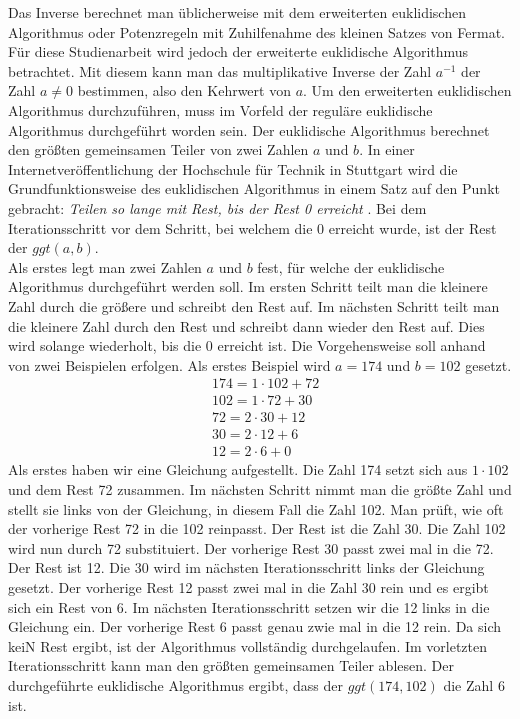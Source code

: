 Das Inverse berechnet man üblicherweise mit dem erweiterten euklidischen Algorithmus oder Potenzregeln mit Zuhilfenahme des kleinen Satzes von Fermat. Für diese Studienarbeit wird jedoch der erweiterte euklidische Algorithmus betrachtet. Mit diesem kann man das multiplikative Inverse der Zahl $a^{-1}$ der Zahl $a \neq 0$ bestimmen, also den Kehrwert von $a$. Um den erweiterten euklidischen Algorithmus durchzuführen, muss im Vorfeld der reguläre euklidische Algorithmus durchgeführt worden sein. Der euklidische Algorithmus berechnet den größten gemeinsamen Teiler von zwei Zahlen $a$ und $b$. In einer Internetveröffentlichung der Hochschule für Technik in Stuttgart wird die Grundfunktionsweise des euklidischen Algorithmus in einem Satz auf den Punkt gebracht: \textit{Teilen so lange mit Rest, bis der Rest 0 erreicht} \cite[S. 2]{HFT.Stuttgart}. Bei dem Iterationsschritt vor dem Schritt, bei welchem die 0 erreicht wurde, ist der Rest der $ggt(a, b)$.\\

Als erstes legt man zwei Zahlen $a$ und $b$ fest, für welche der euklidische Algorithmus durchgeführt werden soll. Im ersten Schritt teilt man die kleinere Zahl durch die größere und schreibt den Rest auf. Im nächsten Schritt teilt man die kleinere Zahl durch den Rest und schreibt dann wieder den Rest auf. Dies wird solange wiederholt, bis die 0 erreicht ist. Die Vorgehensweise soll anhand von zwei Beispielen erfolgen. Als erstes Beispiel wird $a = 174$ und $b = 102$ gesetzt.
\begin{align*}
&174 = 1 \cdot 102 + 72\\
&102 = 1 \cdot 72 + 30\\
&72 = 2 \cdot 30 + 12\\
&30 = 2 \cdot 12 + 6\\
&12 = 2 \cdot 6 + 0
\end{align*}
Als erstes haben wir eine Gleichung aufgestellt. Die Zahl 174 setzt sich aus $1 \cdot 102$ und dem Rest 72 zusammen. Im nächsten Schritt nimmt man die größte Zahl und stellt sie links von der Gleichung, in diesem Fall die Zahl 102. Man prüft, wie oft der vorherige Rest 72 in die 102 reinpasst. Der Rest ist die Zahl 30. Die Zahl 102 wird nun durch 72 substituiert. Der vorherige Rest 30 passt zwei mal in die 72. Der Rest ist 12. Die 30 wird im nächsten Iterationsschritt links der Gleichung gesetzt.  Der vorherige Rest 12 passt zwei mal in die Zahl 30 rein und es ergibt sich ein Rest von 6. Im nächsten Iterationsschritt setzen wir die 12 links in die Gleichung ein. Der vorherige Rest 6 passt genau zwie mal in die 12 rein. Da sich keiN Rest ergibt, ist der Algorithmus vollständig durchgelaufen. Im vorletzten Iterationsschritt kann man den größten gemeinsamen Teiler ablesen. Der durchgeführte euklidische Algorithmus ergibt, dass der $ggt(174, 102)$ die Zahl 6 ist.\\

